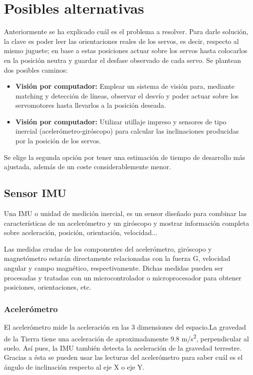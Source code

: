 \section{Posibles alternativas}

Anteriormente se ha explicado cuál es el problema a resolver. Para darle solución, la clave es poder leer las orientaciones reales de los servos, es decir, respecto al mismo juguete; en base a estas posiciones actuar sobre los servos hasta colocarlos en la posición neutra y guardar el desfase observado de cada servo. Se plantean dos posibles caminos:

\begin{itemize}
  \item \textbf{Visión por computador:} Emplear un sistema de visión para, mediante matching y detección de líneas, observar el desvío y poder actuar sobre los servomotores hasta llevarlos a la posición deseada.
  \item \textbf{Visión por computador:} Utilizar utillaje impreso y sensores de tipo inercial (acelerómetro-giróscopo) para calcular las inclinaciones producidas por la posición de los servos.
\end{itemize}

Se elige la segunda opción por tener una estimación de tiempo de desarrollo más ajustada, además de un coste considerablemente menor.

\subsection{Sensor IMU}
Una IMU o unidad de medición inercial, es un sensor diseñado para combinar las características de un acelerómetro y un giróscopo y mostrar información completa sobre aceleración, posición, orientación, velocidad...

Las medidas crudas de los componentes del acelerómetro, giróscopo y magnetómetro estarán directamente relacionadas con la fuerza G, velocidad angular y campo magnético, respectivamente. Dichas medidas pueden ser procesadas y tratadas con un microcontrolador o microprocesador para obtener posiciones, orientaciones, etc.

\subsubsection{Acelerómetro}

El acelerómetro mide la aceleración en las 3 dimensiones del espacio.La gravedad de la Tierra tiene una aceleración de aproximadamente 9.8 m/s\textsuperscript{2}, perpendicular al suelo. Así pues, la IMU también detecta la aceleración de la gravedad terrestre. Gracias a ésta se pueden usar las lecturas del acelerómetro para saber cuál es el ángulo de inclinación respecto al eje X o eje Y.

